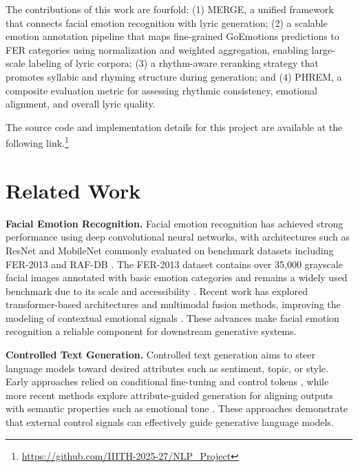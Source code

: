 \documentclass[11pt]{article}
\begin{document}
The contributions of this work are fourfold: (1) MERGE, a unified framework 
that connects facial emotion recognition with lyric generation; (2) a scalable 
emotion annotation pipeline that maps fine-grained GoEmotions predictions to FER 
categories using normalization and weighted aggregation, enabling large-scale 
labeling of lyric corpora; (3) a rhythm-aware reranking strategy that promotes 
syllabic and rhyming structure during generation; and (4) PHREM, a composite 
evaluation metric for assessing rhythmic consistency, emotional alignment, and overall lyric quality.

The source code and implementation details for this project are available
 at the following link.\footnote{\url{https://github.com/IIITH-2025-27/NLP_Project}}


\section{Related Work}

\textbf{Facial Emotion Recognition.}
Facial emotion recognition has achieved strong performance using deep 
convolutional neural networks, with architectures such as ResNet 
and MobileNet commonly evaluated on benchmark datasets including 
FER-2013 and RAF-DB \cite{goodfellow2013challenges, li2017reliable}. 
The FER-2013 dataset contains over 35,000 grayscale facial images 
annotated with basic emotion categories and remains a widely used 
benchmark due to its scale and accessibility \cite{goodfellow2013challenges}. 
Recent work has explored transformer-based architectures and multimodal 
fusion methods, improving the modeling of contextual emotional signals 
\cite{zhang2023multimodal}. These advances make facial emotion recognition 
a reliable component for downstream generative systems.

\textbf{Controlled Text Generation.}
Controlled text generation aims to steer language models toward desired 
attributes such as sentiment, topic, or style. Early approaches relied 
on conditional fine-tuning and control tokens \cite{radford2019language}, 
while more recent methods explore attribute-guided generation for aligning 
outputs with semantic properties such as emotional tone \cite{hu2023attribute}. 
These approaches demonstrate that external control signals can effectively 
guide generative language models.
\end{document}
